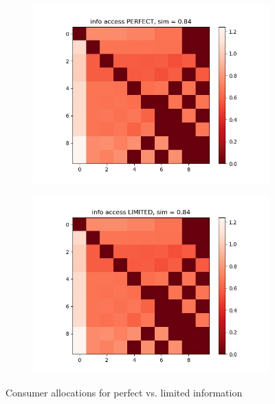 \documentclass[11pt, letterpaper]{article}
\begin{document}
\begin{figure}[h]
    \centering
\begin{adjustbox}{max width=1.5\textwidth,center}
    \begin{subfigure}[b]{0.45\textwidth}
        \includegraphics[width=\linewidth]{"figures/lim/1_heatmap.jpg"}
    \end{subfigure}
    \begin{subfigure}[b]{0.45\textwidth}
        \includegraphics[width=\linewidth]{"figures/lim/2_heatmap.jpg"}
    \end{subfigure}
\end{adjustbox}
\caption{Consumer allocations for perfect vs. limited information}
\label{fig:lim_heatmap}
\end{figure}
\end{document}
